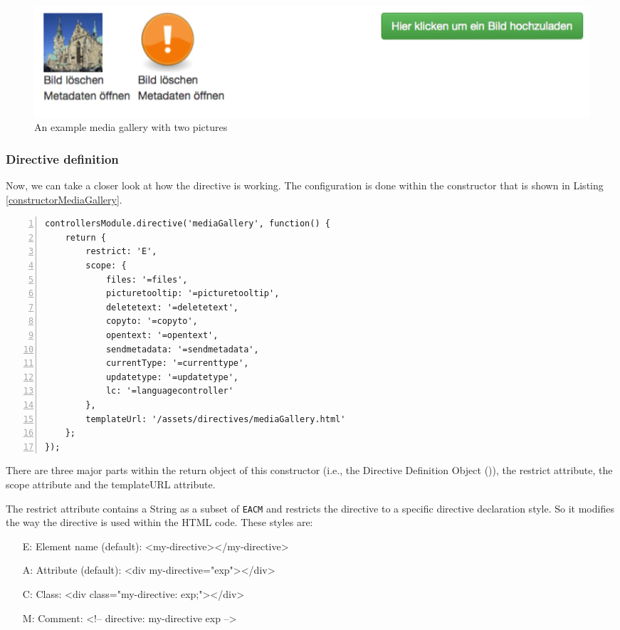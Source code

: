 \begin{figure}[th]
\centerline{\includegraphics[width=1\textwidth]{gfx/mediaGallery}}
\caption{An example media gallery with two pictures}
\label{mediaGallery}
\end{figure}

\subsubsection{Directive definition}
Now, we can take a closer look at how the directive is working. The configuration is done within the constructor that is shown in Listing \ref{constructorMediaGallery}.

\begin{lstlisting}[numbers=left,caption={The listing shows the initialisation of the media gallery directive},label=constructorMediaGallery,frame=tlbr,breaklines]
controllersModule.directive('mediaGallery', function() {
    return {
        restrict: 'E',
        scope: {
            files: '=files',
            picturetooltip: '=picturetooltip',
            deletetext: '=deletetext',
            copyto: '=copyto',
            opentext: '=opentext',
            sendmetadata: '=sendmetadata',
            currentType: '=currenttype',
            updatetype: '=updatetype',
            lc: '=languagecontroller'
        },
        templateUrl: '/assets/directives/mediaGallery.html'
    };
});
\end{lstlisting}

There are three major parts within the return object of this constructor (i.e., the Directive Definition Object (\cite{AngularCons})), the restrict attribute, the scope attribute and the templateURL attribute. 

The restrict attribute contains a String as a subset of \verb|EACM| and restricts the directive to a specific directive declaration style. So it modifies the way the directive is used within the \ac{HTML} code. These styles are:

\begin{itemize}
\item[E:] Element name (default): <my-directive></my-directive>
\item[A:] Attribute (default): <div my-directive="exp"></div>
\item[C:] Class: <div class="my-directive: exp;"></div>
\item[M:] Comment: <!-- directive: my-directive exp -->
\end{itemize}

